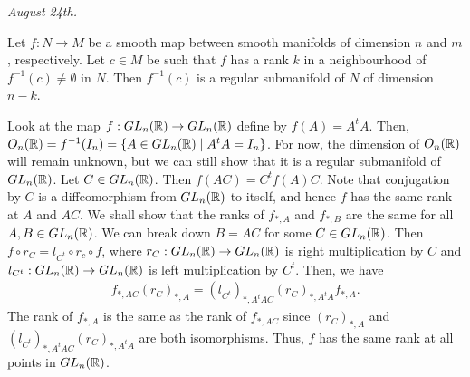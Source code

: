 \textit{August 24th.}
\begin{theorem}
    Let $f:N \to M$ be a smooth map between smooth manifolds of dimension $n$ and $m$, respectively. Let $c \in M$ be such that $f$ has a rank $k$ in a neighbourhood of $f^{-1}(c) \neq \emptyset$ in $N$. Then $f^{-1}(c)$ is a regular submanifold of $N$ of dimension $n-k$.
\end{theorem}


\begin{example}
    Look at the map $f:GL_{n}(\mathbb{R}) \to GL_{n}(\mathbb{R})$ define by $f(A) = A^{t}A$. Then, $O_{n}(\mathbb{R}) = f^{-1}(I_{n}) = \{A \in GL_{n}(\mathbb{R}) \mid A^{t}A = I_{n}\}$. For now, the dimension of $O_{n}(\mathbb{R})$ will remain unknown, but we can still show that it is a regular submanifold of $GL_{n}(\mathbb{R})$. Let $C \in GL_{n}(\mathbb{R})$. Then $f(AC) = C^{t}f(A)C$. Note that conjugation by $C$ is a diffeomorphism from $GL_{n}(\mathbb{R})$ to itself, and hence $f$ has the same rank at $A$ and $AC$. We shall show that the ranks of $f_{\ast,A}$ and $f_{\ast,B}$ are the same for all $A,B \in GL_{n}(\mathbb{R})$. We can break down $B = AC$ for some $C \in GL_{n}(\mathbb{R})$. Then $f \circ r_{C} = l_{C^{t}} \circ r_{c} \circ f$, where $r_{C}:GL_{n}(\mathbb{R}) \to GL_{n}(\mathbb{R})$ is right multiplication by $C$ and $l_{C^{t}}:GL_{n}(\mathbb{R}) \to GL_{n}(\mathbb{R})$ is left multiplication by $C^{t}$. Then, we have
    \begin{align}
        f_{\ast,AC} (r_{C})_{\ast,A} = (l_{C^{t}})_{\ast,A^{t}AC}(r_{C})_{\ast,A^{t}A}f_{\ast,A}.
    \end{align}
    The rank of $f_{\ast,A}$ is the same as the rank of $f_{\ast,AC}$ since $(r_{C})_{\ast,A}$ and $(l_{C^{t}})_{\ast,A^{t}AC}(r_{C})_{\ast,A^{t}A}$ are both isomorphisms. Thus, $f$ has the same rank at all points in $GL_{n}(\mathbb{R})$. 
\end{example}


